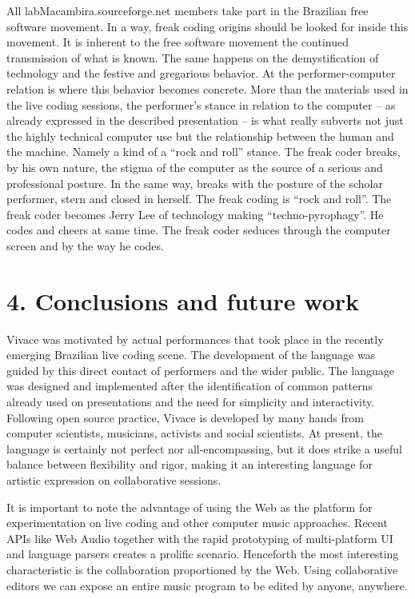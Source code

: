\documentclass[12pt,times,twocolumn]{article}
\begin{document}
All labMacambira.sourceforge.net members take part in the Brazilian
free software movement. In a way, freak coding origins should be
looked for inside this movement. It is inherent to the free software
movement the continued transmission of what is known. The same happens
on the demystification of technology and the festive and gregarious
behavior. At the performer-computer relation is where this behavior
becomes concrete. More than the materials used in the live coding
sessions, the performer's stance in relation to the computer -- as
already expressed in the described presentation -- is what really
subverts not just the highly technical computer use but the
relationship between the human and the machine. Namely a kind of a
``rock and roll'' stance. The freak coder breaks, by his own nature,
the stigma of the computer as the source of a serious and professional
posture. In the same way, breaks with the posture of the scholar
performer, stern and closed in herself. The freak coding is ``rock and
roll''. The freak coder becomes Jerry Lee of technology making
``techno-pyrophagy''. He codes and cheers at same time. The freak
coder seduces through the computer screen and by the way he codes.

\section{4. Conclusions and future work}
Vivace was motivated by actual performances that took place in the
recently emerging Brazilian live coding scene. The development of the
language was guided by this direct contact of performers and the wider
public. The language was designed and implemented after the
identification of common patterns already used on
presentations and the need for simplicity and interactivity.
Following open source practice, Vivace is
developed by many hands from computer scientists, musicians, activists
and social scientists. At present, the language is certainly not perfect nor
all-encompassing, but it does strike a useful balance between
flexibility and rigor, making it an interesting language for artistic
expression on collaborative sessions.

It is important to note the advantage of using the Web as the platform
for experimentation on live coding and other computer music
approaches. Recent APIs like Web Audio together with the rapid
prototyping of multi-platform UI and language parsers creates a
prolific scenario. Henceforth the most interesting characteristic is
the collaboration proportioned by the Web. Using collaborative editors
we can expose an entire music program to be edited by anyone,
anywhere.
\end{document}

